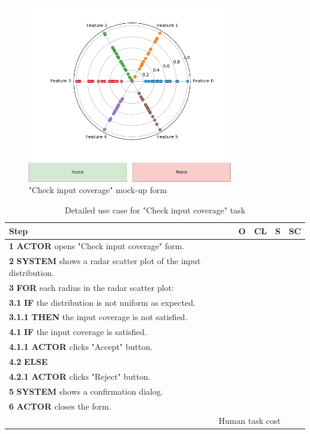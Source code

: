 \begin{figure}[H]
\centering
\includegraphics[width=0.8\textwidth]{figures/check_input_coverage.png}
\caption{"Check input coverage" mock-up form}
\end{figure}

\begin{table}[H]
\centering
\begin{tabularx}{\textwidth}{|X|c|c|c|c|}
\hline
\textbf{Step} & \textbf{O} & \textbf{CL} & \textbf{S} & \textbf{SC} \\
\hline
\textbf{1} \textbf{ACTOR} opens "Check input coverage" form. & & & & \\
\hline
\textbf{2} \textbf{SYSTEM} shows a radar scatter plot of the input distribution. & & & & \\
\hline
\textbf{3} \textbf{FOR} each radius in the radar scatter plot: & & & & \\
\hline
\textbf{3.1} \textbf{IF} the distribution is not uniform as expected. & & & & \\
\hline
\textbf{3.1.1} \textbf{THEN} the input coverage is not satisfied. & & & & \\
\hline
\textbf{4.1} \textbf{IF} the input coverage is satisfied. & & & & \\
\hline
\textbf{4.1.1} \textbf{ACTOR} clicks "Accept" button. & & & & \\
\hline
\textbf{4.2} \textbf{ELSE} & & & & \\
\hline
\textbf{4.2.1} \textbf{ACTOR} clicks "Reject" button. & & & & \\
\hline
\textbf{5} \textbf{SYSTEM} shows a confirmation dialog. & & & & \\
\hline
\textbf{6} \textbf{ACTOR} closes the form. & & & & \\
\hline
\multicolumn{4}{|r|}{Human task cost} & \\
\hline
\end{tabularx}
\caption{Detailed use case for "Check input coverage" task}
\label{table:check_input_coverage}
\end{table}


